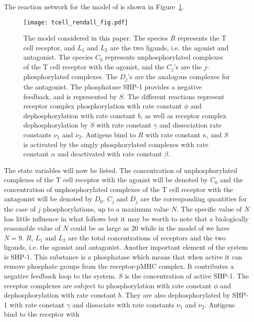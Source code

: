 \documentclass{article}
\begin{document}
The reaction network for the model of \cite{francois13} is shown in
Figure~\ref{fig:reactionnetwork}.
\begin{figure}[ht]
\begin{center}
\texttt{[image: tcell\_rendall\_fig.pdf]}
\end{center}
\caption{The model considered in this paper.  The species $R$ represents the T 
cell
receptor, and $L_1$ and $L_2$ are the two ligands, i.e. the agonist and
antagonist.  The species $C_0$ represents unphosphorylated complexes of the T
cell receptor with the agonist, and the $C_j$'s are the $j$-phosphorylated
complexes.  The $D_j$'s are the analogous complexes for the antagonist.
The phosphatase SHP-1 provides a negative feedback, and is represented by $S$.
The different reactions represent receptor complex phosphorylation with 
rate constant $\phi$ and dephosphorylation with rate constant $b$, as well
as receptor complex dephosphorylation by $S$ with rate constant $\gamma$ 
and dissociation rate constants $\nu_1$ and $\nu_2$. 
Antigens bind to $R$ with rate constant $\kappa$, and $S$ is activated by
the singly phosphorylated complexes with rate constant $\alpha$ and
deactivated with rate constant $\beta$.
}
\label{fig:reactionnetwork}
\end{figure}
The state variables will now be listed. The 
concentration of 
unphosphorylated complexes of the T cell receptor with the agonist will be 
denoted by $C_0$ and the concentration of unphosphorylated complexes of the T 
cell receptor with the antagonist will be denoted by $D_0$. $C_j$ and $D_j$ 
are the corresponding quantities for the case of $j$ phosphorylations, up to a 
maximum value $N$. The specific value of $N$ has little influence in what 
follows but it may be worth to note that a biologically reasonable value of 
$N$ could be as large as 20 while in the model of \cite{altanbonnet05} we
have $N=9$. $R$, $L_1$ and $L_2$ are the total concentrations of receptors and 
the two ligands, i.e. the agonist and antagonist. Another important element of 
the system is SHP-1. This substance is a phosphatase which means that when
active it can remove phosphate groups from the receptor-pMHC complex. It 
contributes a negative feedback loop to the system. $S$ is the concentration 
of active SHP-1. The receptor complexes are subject to phosphorylation with 
rate constant $\phi$ and dephosphorylation with rate constant $b$. They are 
also dephosphorylated by SHP-1 with rate constant $\gamma $ and dissociate 
with rate constants $\nu_1$ and $\nu_2$. Antigens bind to the receptor with 
\end{document}
